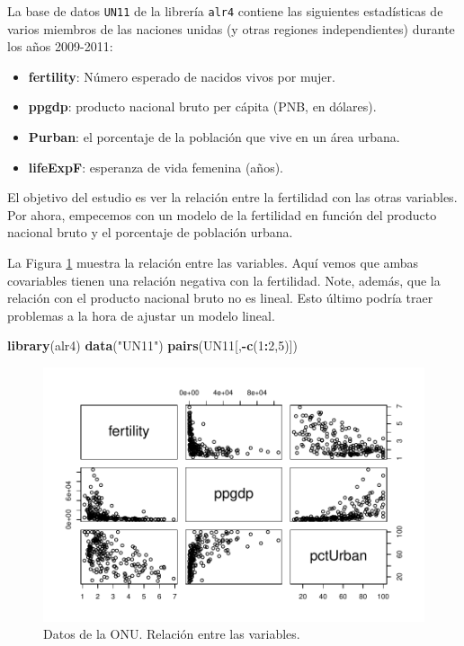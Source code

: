 \documentclass[
]{article}
\newenvironment{Shaded}{\begin{snugshade}}{\end{snugshade}}
\newcommand{\DecValTok}[1]{\textcolor[rgb]{0.00,0.00,0.81}{#1}}
\newcommand{\FunctionTok}[1]{\textcolor[rgb]{0.13,0.29,0.53}{\textbf{#1}}}
\newcommand{\NormalTok}[1]{#1}
\newcommand{\SpecialCharTok}[1]{\textcolor[rgb]{0.81,0.36,0.00}{\textbf{#1}}}
\newcommand{\StringTok}[1]{\textcolor[rgb]{0.31,0.60,0.02}{#1}}
\providecommand{\tightlist}{%
  \setlength{\itemsep}{0pt}\setlength{\parskip}{0pt}}
\begin{document}
La base de datos \texttt{UN11} de la librería \texttt{alr4} contiene las siguientes estadísticas de varios miembros de las naciones unidas (y otras regiones independientes) durante los años 2009-2011:

\begin{itemize}
\tightlist
\item
  \textbf{fertility}: Número esperado de nacidos vivos por mujer.
\item
  \textbf{ppgdp}: producto nacional bruto per cápita (PNB, en dólares).
\item
  \textbf{Purban}: el porcentaje de la población que vive en un área urbana.
\item
  \textbf{lifeExpF}: esperanza de vida femenina (años).
\end{itemize}

El objetivo del estudio es ver la relación entre la fertilidad con las
otras variables. Por ahora, empecemos con un modelo de la fertilidad en función del producto nacional bruto y el porcentaje de población urbana.

La Figura \ref{fig:UNdataFig} muestra la relación entre las variables. Aquí vemos que ambas covariables tienen una relación negativa con la fertilidad. Note, además, que la relación con el producto nacional bruto no es lineal. Esto último podría traer problemas a la hora de ajustar un modelo lineal.

\begin{Shaded}
\begin{Highlighting}[]
\FunctionTok{library}\NormalTok{(alr4)}
\FunctionTok{data}\NormalTok{(}\StringTok{"UN11"}\NormalTok{)}
\FunctionTok{pairs}\NormalTok{(UN11[,}\SpecialCharTok{{-}}\FunctionTok{c}\NormalTok{(}\DecValTok{1}\SpecialCharTok{:}\DecValTok{2}\NormalTok{,}\DecValTok{5}\NormalTok{)])}
\end{Highlighting}
\end{Shaded}

\begin{figure}

{\centering \includegraphics{MLG1_files/figure-latex/UNdataFig-1} 

}

\caption{Datos de la ONU. Relación entre las variables.}\label{fig:UNdataFig}
\end{figure}
\end{document}
